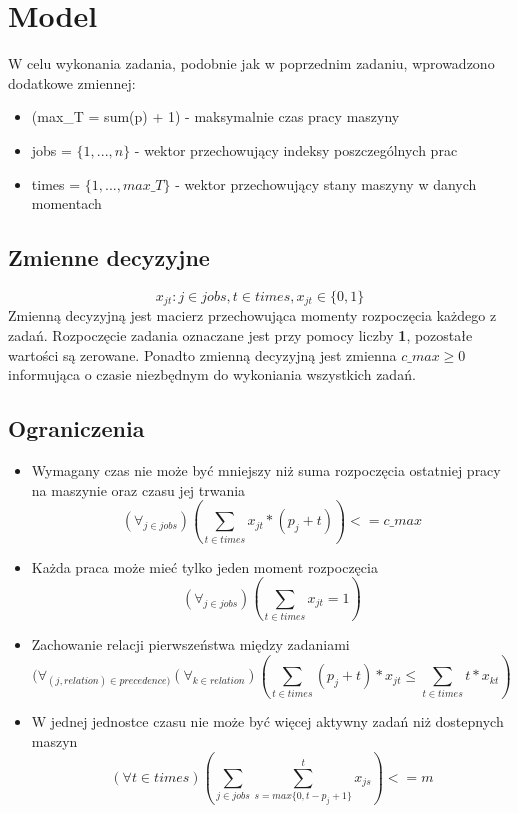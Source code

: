 \documentclass[a4paper,14pt]{report}
\begin{document}
\section{Model}
    W celu wykonania zadania, podobnie jak w poprzednim zadaniu, wprowadzono dodatkowe zmiennej:
    \begin{itemize}
        \item (max\_T = sum(p) + 1) - maksymalnie czas pracy maszyny
        \item jobs = $\{1,...,n\}$ - wektor przechowujący indeksy poszczególnych prac
        \item times = $\{1,...,max\_T\}$ - wektor przechowujący stany maszyny w danych momentach 
    \end{itemize}
    \subsection{Zmienne decyzyjne}
    \begin{equation}
        x_{jt} : j \in jobs, t \in times, x_{jt} \in \{0,1\}
    \end{equation}
    Zmienną decyzyjną jest macierz przechowująca momenty rozpoczęcia każdego z zadań.
    Rozpoczęcie zadania oznaczane jest przy pomocy liczby \textbf{1}, pozostałe wartości 
    są zerowane.
    Ponadto zmienną decyzyjną jest zmienna $c\_max \geq 0$ informująca o czasie niezbędnym do wykoniania
    wszystkich zadań.
    \subsection{Ograniczenia}
        \begin{itemize}
            \item Wymagany czas nie może być mniejszy niż suma rozpoczęcia ostatniej pracy na maszynie oraz czasu jej trwania
            \begin{equation}
                (\forall_{j \in jobs}) (\sum_{t \in times} x_{jt} * (p_{j}+t)) <= c\_max
            \end{equation}
            \item Każda praca może mieć tylko jeden moment rozpoczęcia 
            \begin{equation}
                (\forall_{j \in jobs}) (\sum_{t \in times} x_{jt} = 1 )
            \end{equation}
            \item Zachowanie relacji pierwszeństwa między zadaniami
            \begin{equation}
                (\forall_{(j,relation) \in precedence)} (\forall_{k \in relation}) (\sum_{t \in times} (p_{j} + t)*x_{jt} \leq \sum_{t \in times} t*x_{kt}) 
            \end{equation}
            \item W jednej jednostce czasu nie może być więcej aktywny zadań niż dostepnych maszyn
            \begin{equation}
                (\forall {t \in times}) (\sum_{j \in jobs} \sum_{s = max\{0,t-p_{j}+1 \}}^ {t} x_{js} ) <= m
            \end{equation}
        \end{itemize}
\end{document}
